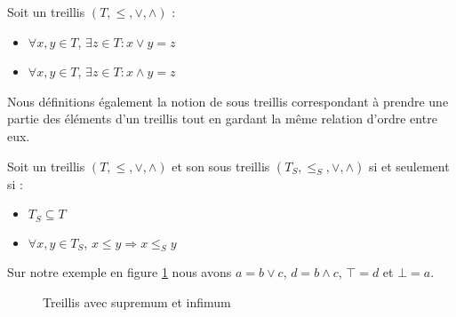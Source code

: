 \begin{definition}[Treillis]
Soit un treillis $(T, \leq, \vee, \wedge)$ :
\begin{itemize}
	\item $\forall x, y \in T$, $\exists z \in T : x \vee y = z$
	\item $\forall x, y \in T$, $\exists z \in T : x \wedge y = z$
\end{itemize}
\end{definition}

Nous définitions également la notion de sous treillis correspondant à prendre une partie des éléments d'un treillis tout en gardant la même relation d'ordre entre eux.

\begin{definition}
Soit un treillis $(T, \leq, \vee, \wedge)$ et son sous treillis $(T_S, \leq_S, \vee, \wedge)$ si et seulement si :
\begin{itemize}
	\item $T_S \subseteq T$
	\item $\forall x, y \in T_S$, $x \leq y \Rightarrow x \leq_S y$
\end{itemize}
\end{definition}

Sur notre exemple en figure \ref{treillis_sup_inf} nous avons $a = b \vee c$, $d = b \wedge c$, $\top = d$ et $\bot = a$.

\begin{figure}[H]
	\begin{minipage}{0.5\textwidth}
	\begin{center}
	\end{center}
	\end{minipage}
	\begin{minipage}{0.5\textwidth}
	\begin{center}
	\end{center}
	\end{minipage}
	\caption{Treillis avec supremum et infimum}
	\label{treillis_sup_inf}
\end{figure}

